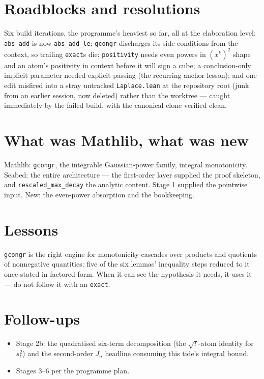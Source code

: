 \documentclass[11pt]{article}
\begin{document}
\section{Roadblocks and resolutions}

Six build iterations, the programme's heaviest so far, all at the
elaboration level: \texttt{abs\_add} is now \texttt{abs\_add\_le};
\texttt{gcongr} discharges its side conditions from the context, so
trailing \texttt{exact}s die; \texttt{positivity} needs even powers in
$(x^k)^2$ shape and an atom's positivity in context before it will sign
a cube; a conclusion-only implicit parameter needed explicit passing
(the recurring anchor lesson); and one edit misfired into a stray
untracked \texttt{Laplace.lean} at the repository root (junk from an
earlier session, now deleted) rather than the worktree --- caught
immediately by the failed build, with the canonical clone verified
clean.

\section{What was Mathlib, what was new}

Mathlib: \texttt{gcongr}, the integrable Gaussian-power family,
integral monotonicity. Seabed: the entire architecture --- the
first-order layer supplied the proof skeleton, and
\texttt{rescaled\_max\_decay} the analytic content. Stage 1 supplied
the pointwise input. New: the even-power absorption and the
bookkeeping.

\section{Lessons}

\texttt{gcongr} is the right engine for monotonicity cascades over
products and quotients of nonnegative quantities: five of the six
lemmas' inequality steps reduced to it once stated in factored form.
When it can see the hypothesis it needs, it uses it --- do not follow
it with an \texttt{exact}.

\section{Follow-ups}

\begin{itemize}
\item Stage 2b: the quadratised six-term decomposition (the
$\sqrt t$-atom identity for $s_t^2$) and the second-order $J_n$
headline consuming this tide's integral bound.
\item Stages 3--6 per the programme plan.
\end{itemize}
\end{document}

